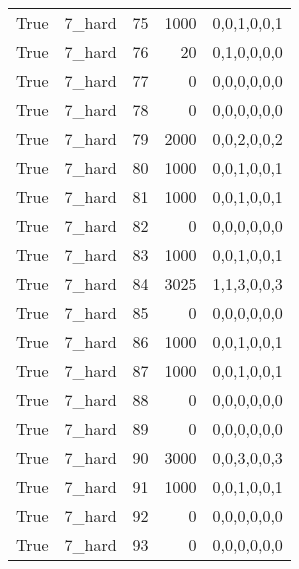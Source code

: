 \begin{tabular}{llrrl}
 True            & 7\_hard              &            75 &                  1000 & 0,0,1,0,0,1   \\
 True            & 7\_hard              &            76 &                    20 & 0,1,0,0,0,0   \\
 True            & 7\_hard              &            77 &                     0 & 0,0,0,0,0,0   \\
 True            & 7\_hard              &            78 &                     0 & 0,0,0,0,0,0   \\
 True            & 7\_hard              &            79 &                  2000 & 0,0,2,0,0,2   \\
 True            & 7\_hard              &            80 &                  1000 & 0,0,1,0,0,1   \\
 True            & 7\_hard              &            81 &                  1000 & 0,0,1,0,0,1   \\
 True            & 7\_hard              &            82 &                     0 & 0,0,0,0,0,0   \\
 True            & 7\_hard              &            83 &                  1000 & 0,0,1,0,0,1   \\
 True            & 7\_hard              &            84 &                  3025 & 1,1,3,0,0,3   \\
 True            & 7\_hard              &            85 &                     0 & 0,0,0,0,0,0   \\
 True            & 7\_hard              &            86 &                  1000 & 0,0,1,0,0,1   \\
 True            & 7\_hard              &            87 &                  1000 & 0,0,1,0,0,1   \\
 True            & 7\_hard              &            88 &                     0 & 0,0,0,0,0,0   \\
 True            & 7\_hard              &            89 &                     0 & 0,0,0,0,0,0   \\
 True            & 7\_hard              &            90 &                  3000 & 0,0,3,0,0,3   \\
 True            & 7\_hard              &            91 &                  1000 & 0,0,1,0,0,1   \\
 True            & 7\_hard              &            92 &                     0 & 0,0,0,0,0,0   \\
 True            & 7\_hard              &            93 &                     0 & 0,0,0,0,0,0   \\

\end{tabular}
